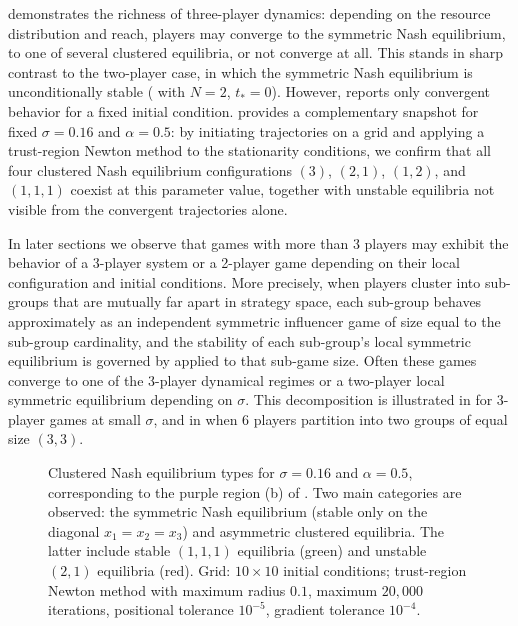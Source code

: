 \documentclass{article}
\begin{document}
                     demonstrates the richness of three-player dynamics: depending on the resource distribution and reach, players may converge to the symmetric Nash equilibrium, to one of several clustered equilibria, or not converge at all. This stands in sharp contrast to the two-player case, in which the symmetric Nash equilibrium is unconditionally stable ( with $N=2$, $t_*=0$). However,  reports only convergent behavior for a fixed initial condition.  provides a complementary snapshot for fixed $\sigma=0.16$ and $\alpha=0.5$: by initiating trajectories on a grid and applying a trust-region Newton method \cite{conn2000trust} to the stationarity conditions, we confirm that all four clustered Nash equilibrium configurations $(3)$, $(2,1)$, $(1,2)$, and $(1,1,1)$ coexist at this parameter value, together with unstable equilibria not visible from the convergent trajectories alone.

                    In later sections we observe that games with more than 3 players may exhibit the behavior of a 3-player system or a 2-player game depending on their local configuration and initial conditions. More precisely, when players cluster into sub-groups that are mutually far apart in strategy space, each sub-group behaves approximately as an independent symmetric influencer game of size equal to the sub-group cardinality, and the stability of each sub-group's local symmetric equilibrium is governed by  applied to that sub-game size. Often these games converge to one of the 3-player dynamical regimes or a two-player local symmetric equilibrium depending on $\sigma$. This decomposition is illustrated in  for 3-player games at small $\sigma$, and in  when 6 players partition into two groups of equal size $(3,3)$. 

                    \begin{figure}[ht!] 
                        
                        \caption{Clustered Nash equilibrium types for $\sigma=0.16$ and $\alpha=0.5$, corresponding to the purple region (b) of . Two main categories are observed: the symmetric Nash equilibrium (stable only on the diagonal $x_1=x_2=x_3$) and asymmetric clustered equilibria. The latter include stable $(1,1,1)$ equilibria (green) and unstable $(2,1)$ equilibria (red). Grid: $10\times 10$ initial conditions; trust-region Newton method \cite{conn2000trust} with maximum radius $0.1$, maximum $20{,}000$ iterations, positional tolerance $10^{-5}$, gradient tolerance $10^{-4}$.} 
                        \label{fig:3player_heatmap}
                    \end{figure}
\end{document}
